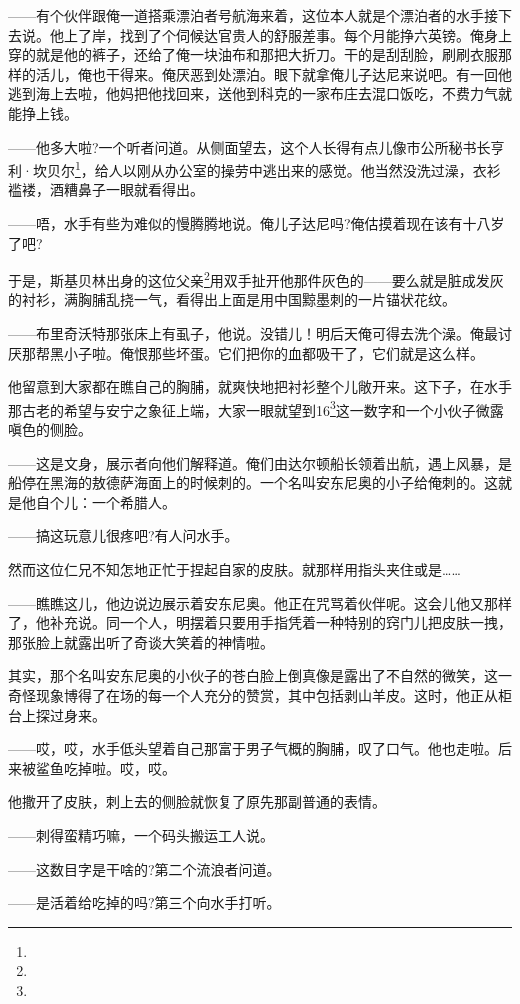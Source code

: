 \par ——有个伙伴跟俺一道搭乘漂泊者号航海来着，这位本人就是个漂泊者的水手接下去说。他上了岸，找到了个伺候达官贵人的舒服差事。每个月能挣六英镑。俺身上穿的就是他的裤子，还给了俺一块油布和那把大折刀。干的是刮刮脸，刷刷衣服那样的活儿，俺也干得来。俺厌恶到处漂泊。眼下就拿俺儿子达尼来说吧。有一回他逃到海上去啦，他妈把他找回来，送他到科克的一家布庄去混口饭吃，不费力气就能挣上钱。
\par ——他多大啦?一个听者问道。从侧面望去，这个人长得有点儿像市公所秘书长亨利·坎贝尔\footnote{}，给人以刚从办公室的操劳中逃出来的感觉。他当然没洗过澡，衣衫褴褛，酒糟鼻子一眼就看得出。
\par ——唔，水手有些为难似的慢腾腾地说。俺儿子达尼吗?俺估摸着现在该有十八岁了吧?
\par 于是，斯基贝林出身的这位父亲\footnote{}用双手扯开他那件灰色的——要么就是脏成发灰的衬衫，满胸脯乱挠一气，看得出上面是用中国黥墨刺的一片锚状花纹。
\par ——布里奇沃特那张床上有虱子，他说。没错儿！明后天俺可得去洗个澡。俺最讨厌那帮黑小子啦。俺恨那些坏蛋。它们把你的血都吸干了，它们就是这么样。
\par 他留意到大家都在瞧自己的胸脯，就爽快地把衬衫整个儿敞开来。这下子，在水手那古老的希望与安宁之象征上端，大家一眼就望到16\footnote{}这一数字和一个小伙子微露嗔色的侧脸。
\par ——这是文身，展示者向他们解释道。俺们由达尔顿船长领着出航，遇上风暴，是船停在黑海的敖德萨海面上的时候刺的。一个名叫安东尼奥的小子给俺刺的。这就是他自个儿：一个希腊人。
\par ——搞这玩意儿很疼吧?有人问水手。
\par 然而这位仁兄不知怎地正忙于捏起自家的皮肤。就那样用指头夹住或是……
\par ——瞧瞧这儿，他边说边展示着安东尼奥。他正在咒骂着伙伴呢。这会儿他又那样了，他补充说。同一个人，明摆着只要用手指凭着一种特别的窍门儿把皮肤一拽，那张脸上就露出听了奇谈大笑着的神情啦。
\par 其实，那个名叫安东尼奥的小伙子的苍白脸上倒真像是露出了不自然的微笑，这一奇怪现象博得了在场的每一个人充分的赞赏，其中包括剥山羊皮。这时，他正从柜台上探过身来。
\par ——哎，哎，水手低头望着自己那富于男子气概的胸脯，叹了口气。他也走啦。后来被鲨鱼吃掉啦。哎，哎。
\par 他撒开了皮肤，刺上去的侧脸就恢复了原先那副普通的表情。
\par ——刺得蛮精巧嘛，一个码头搬运工人说。
\par ——这数目字是干啥的?第二个流浪者问道。
\par ——是活着给吃掉的吗?第三个向水手打听。
